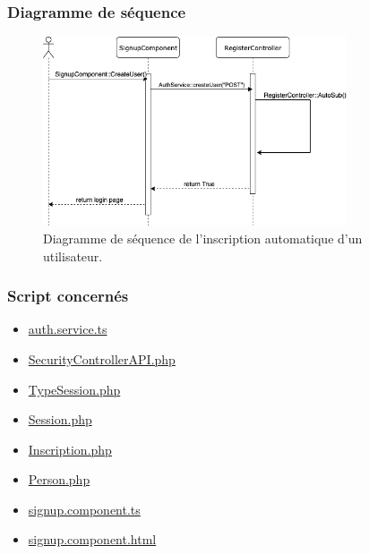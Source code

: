 \subsubsection{Diagramme de séquence}
	\begin{figure}[h]
		\includegraphics[width=0.8\textwidth,center]{Diagramme/sequence-us4-angular}
		\caption{Diagramme de séquence de l'inscription automatique d'un utilisateur. }
	\end{figure}

\vspace{\baselineskip}
\subsubsection{Script concernés}
	\begin{itemize}
		\item \href{https://github.com/victorsmits/Aquabike/blob/master/frontend/src/app/service/auth.service.ts}{auth.service.ts}
		\item \href{https://github.com/victorsmits/Aquabike/blob/master/backend/src/Controller/API/SecurityControllerAPI.php}{SecurityControllerAPI.php}
		\item \href{https://github.com/victorsmits/Aquabike/blob/master/backend/src/Entity/TypeSession.php}{TypeSession.php}
		\item \href{https://github.com/victorsmits/Aquabike/blob/master/backend/src/Entity/Session.php}{Session.php}
		\item \href{https://github.com/victorsmits/Aquabike/blob/master/backend/src/Entity/Inscription.php}{Inscription.php}
		\item \href{https://github.com/victorsmits/Aquabike/blob/master/backend/src/Entity/Person.php}{Person.php}
		\item \href{https://github.com/victorsmits/Aquabike/blob/master/frontend/src/app/signup/signup.component.ts}{signup.component.ts}
		\item \href{https://github.com/victorsmits/Aquabike/blob/master/frontend/src/app/signup/signup.component.html}{signup.component.html}
	\end{itemize}